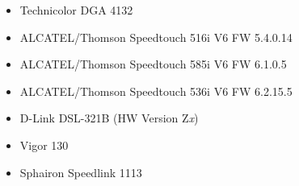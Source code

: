 \begin{itemize}
\item Technicolor DGA 4132
\end{itemize}

\begin{itemize}
\item ALCATEL/Thomson Speedtouch 516i V6 FW 5.4.0.14
\item ALCATEL/Thomson Speedtouch 585i V6 FW 6.1.0.5
\item ALCATEL/Thomson Speedtouch 536i V6 FW 6.2.15.5
\end{itemize}

\begin{itemize}
\item D-Link DSL-321B
(HW Version Z\emph{x})
\end{itemize}

\begin{itemize}
\item Vigor 130
\end{itemize}

\begin{itemize}
\item Sphairon Speedlink 1113
\end{itemize}


